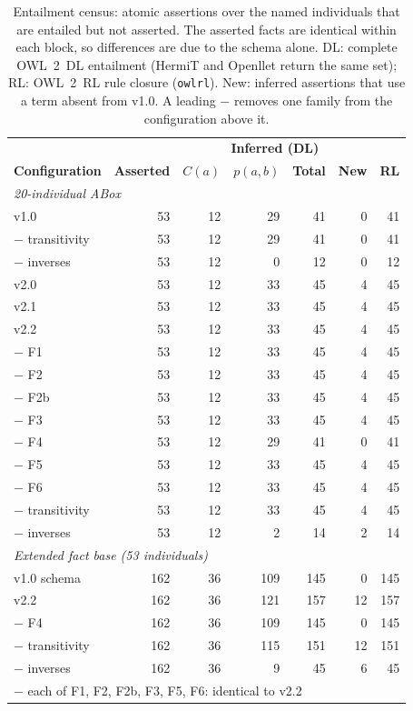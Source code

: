 \begin{table}[!t]
\caption{Entailment census: atomic assertions over the named individuals that are entailed but not asserted. The asserted facts are identical within each block, so differences are due to the schema alone. DL: complete OWL~2~DL entailment (HermiT and Openllet return the same set); RL: OWL~2~RL rule closure (\texttt{owlrl}). New: inferred assertions that use a term absent from v1.0. A leading $-$ removes one family from the configuration above it.}
\label{tab:census}
\centering
\footnotesize
\setlength{\tabcolsep}{4pt}
\begin{tabular}{lrrrrrr}
\hline
& & \multicolumn{4}{c}{\textbf{Inferred (DL)}} & \\
\textbf{Configuration} & \textbf{Asserted} & $C(a)$ & $p(a,b)$ & \textbf{Total} & \textbf{New} & \textbf{RL} \\
\hline
\multicolumn{7}{l}{\emph{20-individual ABox}} \\
v1.0 & 53 & 12 & 29 & 41 & 0 & 41 \\
\quad $-$ transitivity & 53 & 12 & 29 & 41 & 0 & 41 \\
\quad $-$ inverses & 53 & 12 & 0 & 12 & 0 & 12 \\
v2.0 & 53 & 12 & 33 & 45 & 4 & 45 \\
v2.1 & 53 & 12 & 33 & 45 & 4 & 45 \\
v2.2 & 53 & 12 & 33 & 45 & 4 & 45 \\
\quad $-$ F1 & 53 & 12 & 33 & 45 & 4 & 45 \\
\quad $-$ F2 & 53 & 12 & 33 & 45 & 4 & 45 \\
\quad $-$ F2b & 53 & 12 & 33 & 45 & 4 & 45 \\
\quad $-$ F3 & 53 & 12 & 33 & 45 & 4 & 45 \\
\quad $-$ F4 & 53 & 12 & 29 & 41 & 0 & 41 \\
\quad $-$ F5 & 53 & 12 & 33 & 45 & 4 & 45 \\
\quad $-$ F6 & 53 & 12 & 33 & 45 & 4 & 45 \\
\quad $-$ transitivity & 53 & 12 & 33 & 45 & 4 & 45 \\
\quad $-$ inverses & 53 & 12 & 2 & 14 & 2 & 14 \\
\hline
\multicolumn{7}{l}{\emph{Extended fact base (53 individuals)}} \\
v1.0 schema & 162 & 36 & 109 & 145 & 0 & 145 \\
v2.2 & 162 & 36 & 121 & 157 & 12 & 157 \\
\quad $-$ F4 & 162 & 36 & 109 & 145 & 0 & 145 \\
\quad $-$ transitivity & 162 & 36 & 115 & 151 & 12 & 151 \\
\quad $-$ inverses & 162 & 36 & 9 & 45 & 6 & 45 \\
\multicolumn{7}{l}{\quad $-$ each of F1, F2, F2b, F3, F5, F6: identical to v2.2} \\
\hline
\end{tabular}
\end{table}
